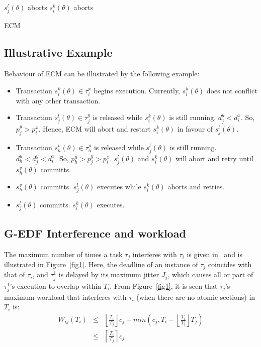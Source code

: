 \documentclass[12pt,english]{report}
\begin{document}
\begin{algorithm}
\footnotesize{
\LinesNumbered
{}
	{$s_j^l(\theta)$ aborts\label{ecm:step_sicommits}\;}
	{$s_i^k(\theta)$ aborts\label{ecm:step_siaborts}\;}
	}
\caption{ECM}
\label{ecm_algorithm}
\end{algorithm}

\subsection{Illustrative Example}\label{ecm_illustrative_ex}
Behaviour of ECM can be illustrated by the following example:
\begin{itemize}
\item Transaction $s_{i}^{k}(\theta)\in\tau_{i}^{x}$ begins execution.
Currently, $s_{i}^{k}(\theta)$ does not conflict with any other transaction.
\item Transaction $s_{j}^{l}(\theta)\in\tau_{j}^{y}$ is released while
$s_{i}^{k}(\theta)$ is still running. $d_{j}^{y}<d_{i}^{x}$. So,
$p_{j}^{y}>p_{i}^{x}$. Hence, ECM will abort and restart $s_{i}^{k}(\theta)$
in favour of $s_{j}^{l}(\theta)$.
\item Transaction $s_{h}^{v}(\theta)\in\tau_{h}^{u}$ is released while
$s_{j}^{l}(\theta)$ is still running. $d_{h}^{u}<d_{j}^{y}<d_{i}^{x}$.
So, $p_{h}^{u}>p_{j}^{y}>p_{i}^{x}$. $s_{j}^{l}(\theta)$ and $s_{i}^{k}(\theta)$
will abort and retry until $s_{h}^{v}(\theta)$ committs.
\item $s_{h}^{v}(\theta)$ committs. $s_{j}^{l}(\theta)$ executes while
$s_{i}^{k}(\theta)$ aborts and retries.
\item $s_{j}^{l}(\theta)$ committs. $s_{i}^{k}(\theta)$ executes.
\end{itemize}


\subsection{\label{sec:g-edf interference and workload}G-EDF Interference and workload}

The maximum number of times a task $\tau_{j}$ interferes with $\tau_{i}$ is given in~\cite{key-2} and is illustrated in Figure~\ref{fig1}. 
Here, the deadline of an instance of $\tau_{j}$ coincides
with that of $\tau_{i}$, and $\tau_{j}^{1}$ is delayed by its maximum
jitter $J_{j}$, which causes all or part of $\tau_{j}^1$'s execution to overlap within $T_i$. From Figure~\ref{fig1}, it is seen that $\tau_{j}$'s maximum workload that interferes with $\tau_{i}$ (when there are no atomic sections) in $T_{i}$ is:
\begin{eqnarray}
W_{ij}\left(T_{i}\right) & \le & \left\lfloor\frac{T_{i}}{T_{j}}\right\rfloor c_{j}+min\left(c_{j},T_{i}-\left\lfloor\frac{T_{i}}{T_{j}}\right\rfloor T_{j}\right)\nonumber \\
 & \le & \left\lceil\frac{T_{i}}{T_{j}}\right\rceil c_{j}\label{eq11}\end{eqnarray}
\end{document}
